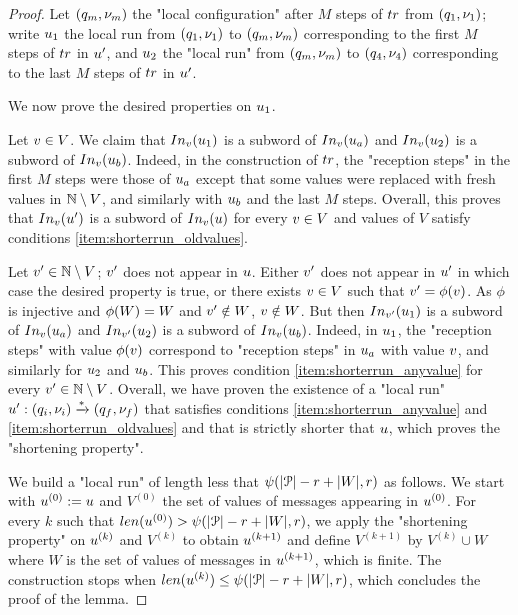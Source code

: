 \begin{proof}
	Let $(q_m, \nu_m)$ the "local configuration" after $M$ steps of $\atrace$ from $(q_1, \nu_1)$; write $u_1$ the local run from $(q_1,\nu_1)$ to $(q_m, \nu_m)$ corresponding to the first $M$ steps of $\atrace$ in $u'$, and $u_2$ the "local run" from $(q_m, \nu_m)$ to $(q_4, \nu_4)$ corresponding to the last $M$ steps of $\atrace$ in $u'$.  
	
	We now prove the desired properties on $u_{1}$.
	
	Let $v \in V$. We claim that $\vinput{\aval}{\localrun_{1}}$ is a subword of $\vinput{\aval}{\localrun_a}$ and $\vinput{\aval}{\localrun_{2}}$ is a subword of $\vinput{\aval}{\localrun_b}$. Indeed, in the construction of $\atrace$, the "reception steps" in the first $M$ steps were those of $u_a$ except that some values were replaced with fresh values in $\mathbb{N} \setminus V$, and similarly with $u_b$ and the last $M$ steps. Overall, this proves that $\vinput{\aval}{\localrun'}$ is a subword of $\vinput{\aval}{\localrun}$ for every $v \in V$ and values of $V$ satisfy conditions \ref{item:shorterrun_oldvalues}. 
	
	Let $v' \in \mathbb{N} \setminus V$; $v'$ does not appear in $u$. Either $v'$ does not appear in $u'$ in which case the desired property is true, or there exists $v \in V$ such that $v' = \phi(v)$. As $\phi$ is injective and $\phi(W) = W$ and $v'\notin W$, $v \notin W$. 
	But then $\vinput{\aval'}{\localrun_{1}}$ is a subword of $\vinput{\aval}{\localrun_a}$ and $\vinput{\aval'}{\localrun_{2}}$ is a subword of $\vinput{\aval}{\localrun_b}$. Indeed, in $u_1$, the "reception steps" with value $\phi(v)$ correspond to "reception steps" in $u_a$ with value $v$, and similarly for $u_2$ and $u_b$. This proves condition \ref{item:shorterrun_anyvalue} for every $v' \in \mathbb{N} \setminus V$.
	Overall, we have proven the existence of a "local run" $u': (q_i,\nu_i) \xrightarrow{*} (q_f,\nu_f)$ that satisfies conditions \ref{item:shorterrun_anyvalue} and \ref{item:shorterrun_oldvalues} and that is strictly shorter that $u$, which proves the "shortening property".
	
	We build a "local run" of length less that $\psi(|\mathcal{P}|-r+|W|,r)$ as follows. We start with $u^{(0)} := u$ and $V^{(0)}$ the set of values of messages appearing in $u^{(0)}$. For every $k$ such that $\length{\localrun^{(0)}} > \towerfun(\size{\prot}-r+\size{\Vinit},\regnum)$, we apply the "shortening property" on $u^{(k)}$ and $V^{(k)}$ to obtain $u^{(k+1)}$ and define $V^{(k+1)}$ by $V^{(k)} \cup W$ where $W$ is the set of values of messages in $u^{(k+1)}$, which is finite.
	The construction stops when $\length{\localrun^{(k)}} \leq \towerfun(\size{\prot}-r + \size{\Vinit},\regnum)$, which concludes the proof of the lemma. 
\end{proof}

